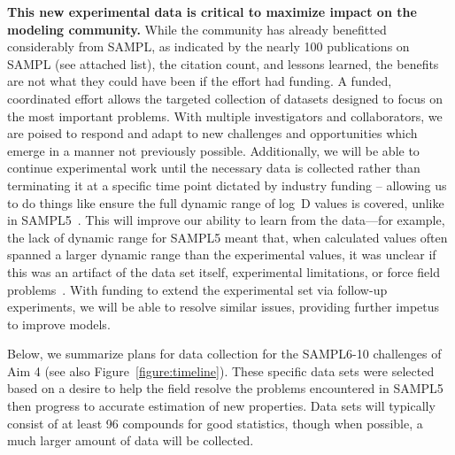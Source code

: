 \documentclass[11pt]{article}
\begin{document}
\textbf{This new experimental data is critical to maximize impact on the modeling community.} 
While the community has already benefitted considerably from SAMPL, as indicated by the nearly 100 publications on SAMPL (see attached list), the citation count, and lessons learned, the benefits are not what they could have been if the effort had funding.
A funded, coordinated effort allows the targeted collection of datasets designed to focus on the most important problems. 
With multiple investigators and collaborators, we are poised to respond and adapt to new challenges and opportunities which emerge in a manner not previously possible.
Additionally, we will be able to continue experimental work until the necessary data is collected rather than terminating it at a specific time point dictated by industry funding -- allowing us to do things like ensure the full dynamic range of log~D values is covered, unlike in SAMPL5~\cite{rustenburg_measuring_2016, bannan_blind_2016}.
This will improve our ability to learn from the data---for example, the lack of dynamic range for SAMPL5 meant that, when calculated values often spanned a larger dynamic range than the experimental values, it was unclear if this was an artifact of the data set itself, experimental limitations, or force field problems~\cite{rustenburg_measuring_2016, bannan_blind_2016, paranahewage_predicting_2016, klamt_prediction_2016}. 
With funding to extend the experimental set via follow-up experiments, we will be able to resolve similar issues, providing further impetus to improve models.


Below, we summarize plans for data collection for the SAMPL6-10 challenges of Aim 4 (see also Figure~\ref{figure:timeline}).
These specific data sets were selected based on a desire to help the field resolve the problems encountered in SAMPL5 then progress to accurate estimation of new properties.
Data sets will typically consist of at least 96 compounds for good statistics, though when possible, a much larger amount of data will be collected.
\end{document}

